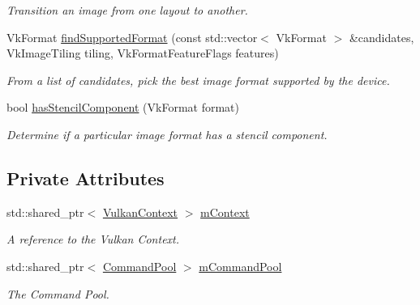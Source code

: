 \begin{DoxyCompactItemize}
\begin{DoxyCompactList}\small\item\em Transition an image from one layout to another. \end{DoxyCompactList}\item 
Vk\+Format \mbox{\hyperlink{class_image_manager_a338ec2097cbf83969ebd9d1dd99f6f28}{find\+Supported\+Format}} (const std\+::vector$<$ Vk\+Format $>$ \&candidates, Vk\+Image\+Tiling tiling, Vk\+Format\+Feature\+Flags features)
\begin{DoxyCompactList}\small\item\em From a list of candidates, pick the best image format supported by the device. \end{DoxyCompactList}\item 
bool \mbox{\hyperlink{class_image_manager_a72514a07ec6cc0b2d0eff713b8c42757}{has\+Stencil\+Component}} (Vk\+Format format)
\begin{DoxyCompactList}\small\item\em Determine if a particular image format has a stencil component. \end{DoxyCompactList}\end{DoxyCompactItemize}
\subsection*{Private Attributes}
\begin{DoxyCompactItemize}
\item 
\mbox{\label{class_image_manager_a1adcb94b57d9c8953bf8549cf5d16623}} 
std\+::shared\+\_\+ptr$<$ \mbox{\hyperlink{class_vulkan_context}{Vulkan\+Context}} $>$ \mbox{\hyperlink{class_image_manager_a1adcb94b57d9c8953bf8549cf5d16623}{m\+Context}}
\begin{DoxyCompactList}\small\item\em A reference to the Vulkan Context. \end{DoxyCompactList}\item 
\mbox{\label{class_image_manager_aa83758c1d4c59fb3668d06062805276e}} 
std\+::shared\+\_\+ptr$<$ \mbox{\hyperlink{class_command_pool}{Command\+Pool}} $>$ \mbox{\hyperlink{class_image_manager_aa83758c1d4c59fb3668d06062805276e}{m\+Command\+Pool}}
\begin{DoxyCompactList}\small\item\em The Command Pool. \end{DoxyCompactList}\end{DoxyCompactItemize}


